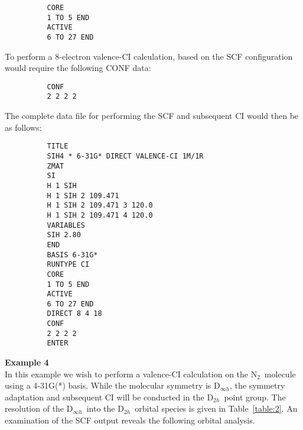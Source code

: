 \documentclass[11pt,fleqn]{article}
\newcommand{\dinfh}{\mbox{D$_{\infty h}$}}
\newcommand{\dtwoh}{\mbox{D$_{2h}$}}
\newcommand{\nitrog}{\mbox{N$_{2}$}}
\begin{document}
{
\footnotesize
\begin{verbatim}
          CORE
          1 TO 5 END
          ACTIVE
          6 TO 27 END
\end{verbatim}
}
To perform a 8-electron valence-CI calculation,
based on the SCF configuration would require the following CONF data:

{
\footnotesize
\begin{verbatim}
          CONF
          2 2 2 2  
\end{verbatim}
}
The complete data file for performing the
SCF and subsequent CI would then be as follows:
{
\footnotesize
\begin{verbatim}
          TITLE
          SIH4 * 6-31G* DIRECT VALENCE-CI 1M/1R
          ZMAT 
          SI
          H 1 SIH
          H 1 SIH 2 109.471
          H 1 SIH 2 109.471 3 120.0
          H 1 SIH 2 109.471 4 120.0
          VARIABLES
          SIH 2.80   
          END
          BASIS 6-31G*
          RUNTYPE CI
          CORE
          1 TO 5 END
          ACTIVE
          6 TO 27 END
          DIRECT 8 4 18
          CONF
          2 2 2 2
          ENTER
\end{verbatim}
}

{\bf Example 4}\\

In this example we wish to perform a valence-CI calculation 
on the \nitrog\ molecule using a 4-31G(*)  basis. While the molecular symmetry
is \dinfh, the symmetry adaptation  and subsequent CI will be conducted in the
\dtwoh\ point group. The resolution of the \dinfh\ into the \dtwoh\
orbital species is given in Table~\ref{table:2}.
An examination of the SCF output reveals the following orbital analysis.
\end{document}
